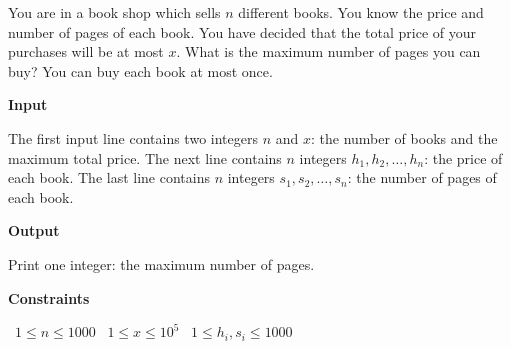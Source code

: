 You are in a book shop which sells $n$ different books. You know the price and number of pages of each book.
You have decided that the total price of your purchases will be at most $x$. What is the maximum number of pages you can buy? You can buy each book at most once.

\vspace{0.3cm}\noindent\textbf{Input}

The first input line contains two integers $n$ and $x$: the number of books and the maximum total price.
The next line contains $n$ integers $h_1,h_2,\ldots,h_n$: the price of each book.
The last line contains $n$ integers $s_1,s_2,\ldots,s_n$: the number of pages of each book.

\vspace{0.3cm}\noindent\textbf{Output}

Print one integer: the maximum number of pages.

\vspace{0.3cm}\noindent\textbf{Constraints}

\textbullet\ $1 \le n \le 1000$
\textbullet\ $1 \le x \le 10^5$
\textbullet\ $1 \le h_i, s_i \le 1000$